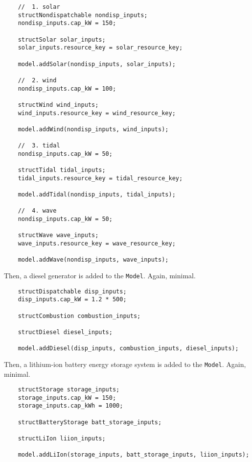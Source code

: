 \documentclass[12pt, letterpaper]{report}
\begin{document}
\newpage 
\begin{verbatim}
    //  1. solar
    structNondispatchable nondisp_inputs;
    nondisp_inputs.cap_kW = 150;
    
    structSolar solar_inputs;
    solar_inputs.resource_key = solar_resource_key;
    
    model.addSolar(nondisp_inputs, solar_inputs);
    
    //  2. wind
    nondisp_inputs.cap_kW = 100;
    
    structWind wind_inputs;
    wind_inputs.resource_key = wind_resource_key;
    
    model.addWind(nondisp_inputs, wind_inputs);
    
    //  3. tidal
    nondisp_inputs.cap_kW = 50;
    
    structTidal tidal_inputs;
    tidal_inputs.resource_key = tidal_resource_key;
    
    model.addTidal(nondisp_inputs, tidal_inputs);
    
    //  4. wave
    nondisp_inputs.cap_kW = 50;
    
    structWave wave_inputs;
    wave_inputs.resource_key = wave_resource_key;
    
    model.addWave(nondisp_inputs, wave_inputs);
\end{verbatim}

\noindent Then, a diesel generator is added to the \texttt{Model}. Again, minimal.

\begin{verbatim}
    structDispatchable disp_inputs;
    disp_inputs.cap_kW = 1.2 * 500;
    
    structCombustion combustion_inputs;
    
    structDiesel diesel_inputs;
    
    model.addDiesel(disp_inputs, combustion_inputs, diesel_inputs);
\end{verbatim}

\noindent Then, a lithium-ion battery energy storage system is added to the \texttt{Model}. Again, minimal.

\begin{verbatim}
    structStorage storage_inputs;
    storage_inputs.cap_kW = 150;
    storage_inputs.cap_kWh = 1000;
    
    structBatteryStorage batt_storage_inputs;
    
    structLiIon liion_inputs;
    
    model.addLiIon(storage_inputs, batt_storage_inputs, liion_inputs);
\end{verbatim}
\end{document}
